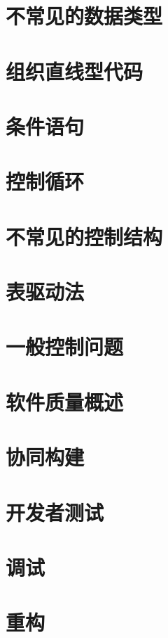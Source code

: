 \documentclass{article}
\begin{document}
\section{不常见的数据类型}

\section{组织直线型代码}

\section{条件语句}

\section{控制循环}

\section{不常见的控制结构}

\section{表驱动法}

\section{一般控制问题}

\section{软件质量概述}

\section{协同构建}

\section{开发者测试}

\section{调试}

\section{重构}
\end{document}
